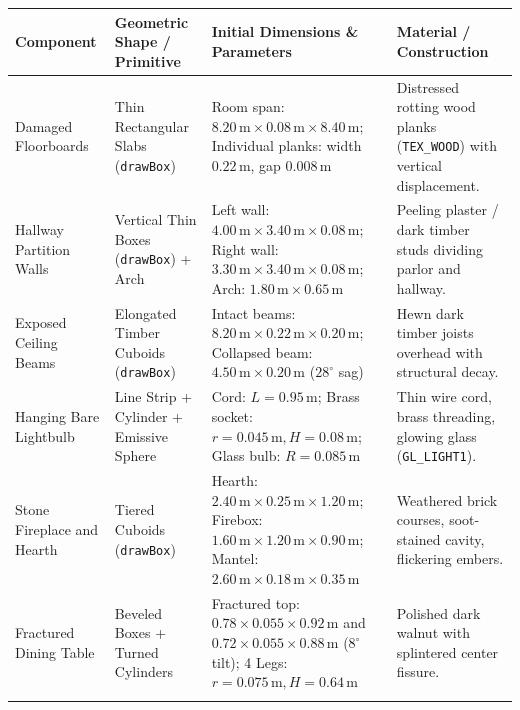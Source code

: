 \documentclass[10pt,a4paper,oneside]{article}
\begin{document}
\begin{longtable}{>{\raggedright\arraybackslash}p{}>{\raggedright\arraybackslash}p{}>{\raggedright\arraybackslash}p{}>{\raggedright\arraybackslash}p{}}
\toprule
\textbf{Component} & \textbf{Geometric Shape / Primitive} & \textbf{Initial Dimensions \& Parameters} & \textbf{Material / Construction} \\
\midrule
\endhead

Damaged Floorboards & Thin Rectangular Slabs (\texttt{drawBox}) & Room span: $8.20\,\mathrm{m} \times 0.08\,\mathrm{m} \times 8.40\,\mathrm{m}$; Individual planks: width $0.22\,\mathrm{m}$, gap $0.008\,\mathrm{m}$ & Distressed rotting wood planks (\texttt{TEX\_WOOD}) with vertical displacement.\\\addlinespace[3pt]

Hallway Partition Walls & Vertical Thin Boxes (\texttt{drawBox}) + Arch & Left wall: $4.00\,\mathrm{m} \times 3.40\,\mathrm{m} \times 0.08\,\mathrm{m}$; Right wall: $3.30\,\mathrm{m} \times 3.40\,\mathrm{m} \times 0.08\,\mathrm{m}$; Arch: $1.80\,\mathrm{m}\times 0.65\,\mathrm{m}$ & Peeling plaster / dark timber studs dividing parlor and hallway.\\\addlinespace[3pt]

Exposed Ceiling Beams & Elongated Timber Cuboids (\texttt{drawBox}) & 3 Intact beams: $8.20\,\mathrm{m} \times 0.22\,\mathrm{m} \times 0.20\,\mathrm{m}$; Collapsed beam: $4.50\,\mathrm{m} \times 0.20\,\mathrm{m}$ ($28^\circ$ sag) & Hewn dark timber joists overhead with structural decay.\\\addlinespace[3pt]

Hanging Bare Lightbulb & Line Strip + Cylinder + Emissive Sphere & Cord: $L=0.95\,\mathrm{m}$; Brass socket: $r=0.045\,\mathrm{m}, H=0.08\,\mathrm{m}$; Glass bulb: $R=0.085\,\mathrm{m}$ & Thin wire cord, brass threading, glowing glass (\texttt{GL\_LIGHT1}).\\\addlinespace[3pt]

Stone Fireplace and Hearth & Tiered Cuboids (\texttt{drawBox}) & Hearth: $2.40\,\mathrm{m}\times 0.25\,\mathrm{m}\times 1.20\,\mathrm{m}$; Firebox: $1.60\,\mathrm{m}\times 1.20\,\mathrm{m}\times 0.90\,\mathrm{m}$; Mantel: $2.60\,\mathrm{m}\times 0.18\,\mathrm{m}\times 0.35\,\mathrm{m}$ & Weathered brick courses, soot-stained cavity, flickering embers.\\\addlinespace[3pt]

Fractured Dining Table & Beveled Boxes + Turned Cylinders & Fractured top: $0.78\times 0.055\times 0.92\,\mathrm{m}$ and $0.72\times 0.055\times 0.88\,\mathrm{m}$ ($8^\circ$ tilt); 4 Legs: $r=0.075\,\mathrm{m}, H=0.64\,\mathrm{m}$ & Polished dark walnut with splintered center fissure.\\\addlinespace[3pt]


\end{longtable}
\end{document}
